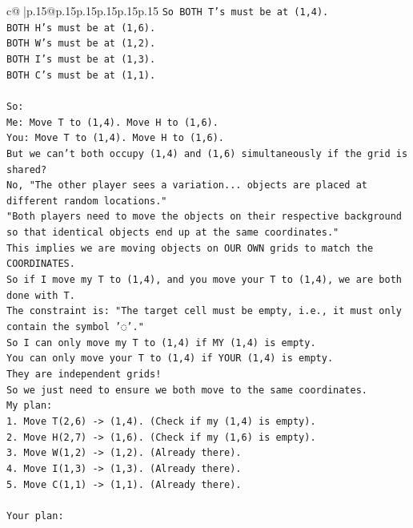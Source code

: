 \documentclass{article}
\begin{document}
{\begin{supertabular}{c@{$\;$}|p{.15\linewidth}@{}p{.15\linewidth}p{.15\linewidth}p{.15\linewidth}p{.15\linewidth}p{.15\linewidth}}
{{{\texttt{So BOTH T's must be at (1,4).} \\
\texttt{BOTH H's must be at (1,6).} \\
\texttt{BOTH W's must be at (1,2).} \\
\texttt{BOTH I's must be at (1,3).} \\
\texttt{BOTH C's must be at (1,1).} \\
\\ 
\texttt{So:} \\
\texttt{Me: Move T to (1,4). Move H to (1,6).} \\
\texttt{You: Move T to (1,4). Move H to (1,6).} \\
\texttt{But we can't both occupy (1,4) and (1,6) simultaneously if the grid is shared?} \\
\texttt{No, "The other player sees a variation... objects are placed at different random locations."} \\
\texttt{"Both players need to move the objects on their respective background so that identical objects end up at the same coordinates."} \\
\texttt{This implies we are moving objects on OUR OWN grids to match the COORDINATES.} \\
\texttt{So if I move my T to (1,4), and you move your T to (1,4), we are both done with T.} \\
\texttt{The constraint is: "The target cell must be empty, i.e., it must only contain the symbol '◌'."} \\
\texttt{So I can only move my T to (1,4) if MY (1,4) is empty.} \\
\texttt{You can only move your T to (1,4) if YOUR (1,4) is empty.} \\
\texttt{They are independent grids!} \\
\texttt{So we just need to ensure we both move to the same coordinates.} \\
\texttt{My plan:} \\
\texttt{1. Move T(2,6) {-}> (1,4). (Check if my (1,4) is empty).} \\
\texttt{2. Move H(2,7) {-}> (1,6). (Check if my (1,6) is empty).} \\
\texttt{3. Move W(1,2) {-}> (1,2). (Already there).} \\
\texttt{4. Move I(1,3) {-}> (1,3). (Already there).} \\
\texttt{5. Move C(1,1) {-}> (1,1). (Already there).} \\
\\ 
\texttt{Your plan:} \\
}}}
\end{supertabular}}
\end{document}
